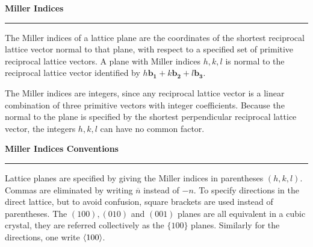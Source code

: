 \documentclass[10.75pt,a4paper,openright,bottom=2cm]{article}
\renewcommand{\Vec}[1]{\boldsymbol{#1}}
\begin{document}
\begin{mybox}
\textbf{Miller Indices {\color{blue!30}{g}}}
\hrule
\vspace{0.15cm}
The Miller indices of a lattice plane are the coordinates of the shortest reciprocal lattice vector normal to that plane, with respect to a specified set of primitive reciprocal lattice vectors. A plane with Miller indices $h,k,l$ is normal to the reciprocal lattice vector identified by $h\Vec{b_1}+k\Vec{b_2}+l\Vec{b_3}$.
\end{mybox}
\noindent
The Miller indices are integers, since any reciprocal lattice vector is a linear combination of three primitive vectors with integer coefficients. Because the normal to the plane is specified by the shortest perpendicular reciprocal lattice vector, the integers $h,k,l$ can have no common factor.
\begin{mybox}
\textbf{Miller Indices Conventions {\color{blue!30}{g}}}
\hrule
\vspace{0.15cm}
Lattice planes are specified by giving the Miller indices in parentheses $(h,k,l)$. Commas are eliminated by writing $\overline{n}$ instead of $-n$. To specify directions in the direct lattice, but to avoid confusion, square brackets are used instead of parentheses. The $(100), (010)$ and $(001)$ planes are all equivalent in a cubic crystal, they are referred collectively as the $\{100\}$ planes. Similarly for the directions, one write $\Braket{100}$.
\end{mybox}
\noindent
\end{document}

